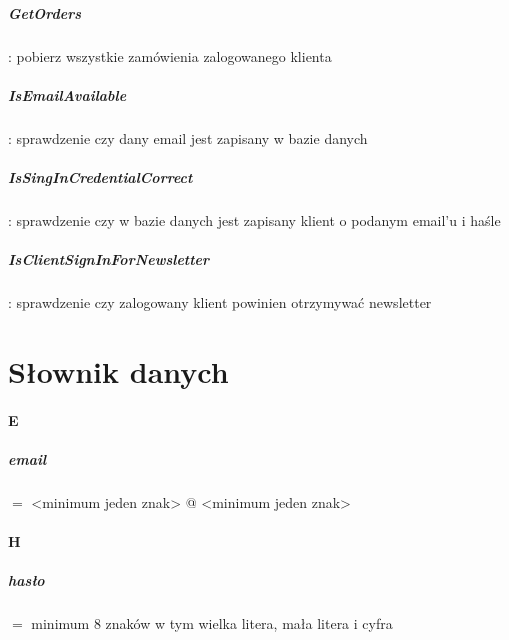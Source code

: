 \documentclass[12pt]{report}
\begin{document}
				\paragraph{GetOrders} : pobierz wszystkie zamówienia zalogowanego klienta 
		
				\paragraph{IsEmailAvailable} : sprawdzenie czy dany email jest zapisany w bazie danych
	
				\paragraph{IsSingInCredentialCorrect} : sprawdzenie czy w bazie danych jest zapisany klient o podanym email’u i haśle
		
				\paragraph{IsClientSignInForNewsletter} : sprawdzenie czy zalogowany klient powinien otrzymywać newsletter
			


\chapter{Słownik danych}
	
	\subsubsection{E}
		\paragraph{email} $=$ <minimum jeden znak> @ <minimum jeden znak> 
		\subsubsection{H}
		\paragraph{hasło} $=$ minimum 8 znaków w tym wielka litera, mała litera i cyfra 
\end{document}
